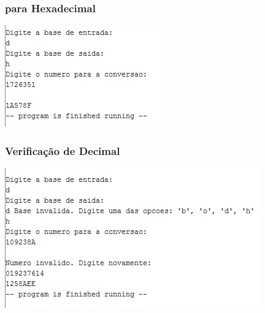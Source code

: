 \documentclass[10pt,a4paper]{article}
\begin{document}
\begin{figure}[H]
\begin{minipage}[t]{.5\textwidth}
\subsubsection{para Hexadecimal}
\includegraphics[width=\textwidth]{DH.jpg}
\end{minipage}
\begin{minipage}[t]{.5\textwidth}
\subsubsection{Verificação de Decimal}
\includegraphics[width=\textwidth]{DecFail.jpg}
\end{minipage}
\end{figure}
\newpage
\end{document}

